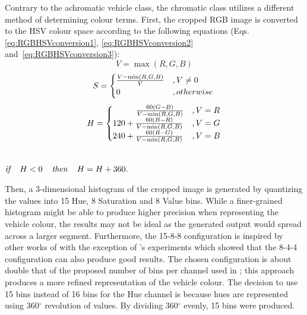 Contrary to the achromatic vehicle class, the chromatic class utilizes a different method of determining colour terms.
First, the cropped RGB image is converted to the HSV colour space according to the following equations (Eqs. \ref{eq:RGBHSVconversion1}, \ref{eq:RGBHSVconversion2} and~\ref{eq:RGBHSVconversion3}): 
\begin{equation}
\label{eq:RGBHSVconversion1}
V = \max(R,G,B)
\end{equation}
\begin{equation}
\label{eq:RGBHSVconversion2}
S = \begin{cases}\frac{V - \min(R,G,B)}{V} & , V \neq 0\\
0 & , otherwise \end{cases} \\
\end{equation}
\begin{equation}
\label{eq:RGBHSVconversion3}
H = \begin{cases}
\hspace{2.8em} \frac{60(G-B)}{V-\min(R,G,B)} & ,V = R\\
120 + \frac{60(B-R)}{V-\min(R,G,B)} & ,V = G\\
240 + \frac{60(R-G)}{V-\min(R,G,B)} & ,V = B
\end{cases}
\end{equation}
\centerline{\\$\textit{if } \hspace{.8em}H< 0 \hspace{.8em}\textit{ then } \hspace{.8em}H = H+360.$}
Then, a 3-dimensional histogram of the cropped image is generated by quantizing the values into 15 Hue, 8 Saturation and 8 Value bins.
While a finer-grained histogram might be able to produce higher precision when representing the vehicle colour, the results may not be ideal as the generated output would spread across a larger segment.
Furthermore, the 15-8-8 configuration is inspired by other works of \cite{kim2008deciding, castanon2016retrieval} with the exception of 's experiments which showed that the 8-4-4 configuration can also produce good results.
The chosen configuration is about double that of the proposed number of bins per channel used in \cite{kim2008deciding}; this approach produces a more refined representation of the vehicle colour.
The decision to use 15 bins instead of 16 bins for the Hue channel is because hues are represented using 360$^{\circ}$ revolution of values. By dividing 360$^{\circ}$ evenly, 15 bins were produced.

